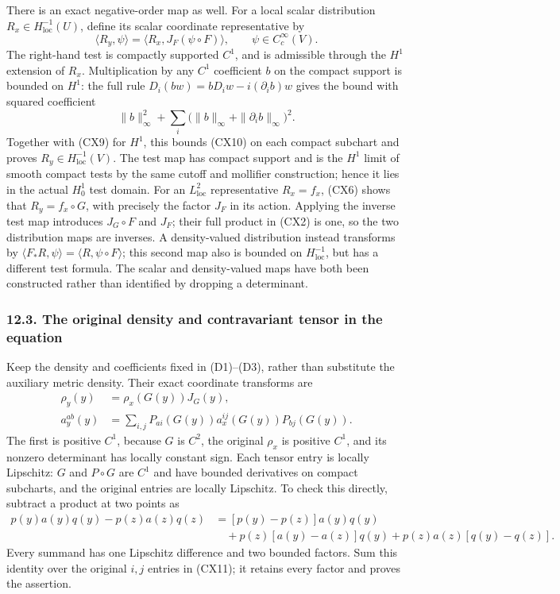 \documentclass[
  11pt,
]{article}
\begin{document}
There is an exact negative-order map as well. For a local scalar
distribution \(R_x\in H^{-1}_{\mathrm{loc}}(U)\), define its scalar
coordinate representative by \[
       \langle R_y,\psi\rangle
       =\langle R_x,J_F(\psi\circ F)\rangle,\qquad
                         \psi\in C_c^\infty(V).                 \tag{CX10}
\] The right-hand test is compactly supported \(C^1\), and is admissible
through the \(H^1\) extension of \(R_x\). Multiplication by any \(C^1\)
coefficient \(b\) on the compact support is bounded on \(H^1\): the full
rule \(D_i(bw)=bD_iw-i(\partial_i b)w\) gives the bound with squared
coefficient \[
 \|b\|_\infty^2+
      \sum_i\bigl(\|b\|_\infty+\|\partial_i b\|_\infty\bigr)^2 .
\] Together with (CX9) for \(H^1\), this bounds (CX10) on each compact
subchart and proves \(R_y\in H^{-1}_{\mathrm{loc}}(V)\). The test map
has compact support and is the \(H^1\) limit of smooth compact tests by
the same cutoff and mollifier construction; hence it lies in the actual
\(H_0^1\) test domain. For an \(L^2_{\mathrm{loc}}\) representative
\(R_x=f_x\), (CX6) shows that \(R_y=f_x\circ G\), with precisely the
factor \(J_F\) in its action. Applying the inverse test map introduces
\(J_G\circ F\) and \(J_F\); their full product in (CX2) is one, so the
two distribution maps are inverses. A density-valued distribution
instead transforms by
\(\langle F_*R,\psi\rangle=\langle R,\psi\circ F\rangle\); this second
map also is bounded on \(H^{-1}_{\mathrm{loc}}\), but has a different
test formula. The scalar and density-valued maps have both been
constructed rather than identified by dropping a determinant.

\subsubsection{12.3. The original density and contravariant tensor in
the
equation}\label{the-original-density-and-contravariant-tensor-in-the-equation}

Keep the density and coefficients fixed in (D1)--(D3), rather than
substitute the auxiliary metric density. Their exact coordinate
transforms are \[
 \begin{split}
 \rho_y(y)&=\rho_x(G(y))J_G(y),\\
 a_y^{ab}(y)
  &=\sum_{i,j}P_{ai}(G(y))a_x^{ij}(G(y))P_{bj}(G(y)).
 \end{split}                                                   \tag{CX11}
\] The first is positive \(C^1\), because \(G\) is \(C^2\), the original
\(\rho_x\) is positive \(C^1\), and its nonzero determinant has locally
constant sign. Each tensor entry is locally Lipschitz: \(G\) and
\(P\circ G\) are \(C^1\) and have bounded derivatives on compact
subcharts, and the original entries are locally Lipschitz. To check this
directly, subtract a product at two points as \[
 \begin{split}
 p(y)a(y)q(y)-p(z)a(z)q(z)
  &=[p(y)-p(z)]a(y)q(y)\\
  &\quad+p(z)[a(y)-a(z)]q(y)
             +p(z)a(z)[q(y)-q(z)] .
 \end{split}
\] Every summand has one Lipschitz difference and two bounded factors.
Sum this identity over the original \(i,j\) entries in (CX11); it
retains every factor and proves the assertion.
\end{document}
